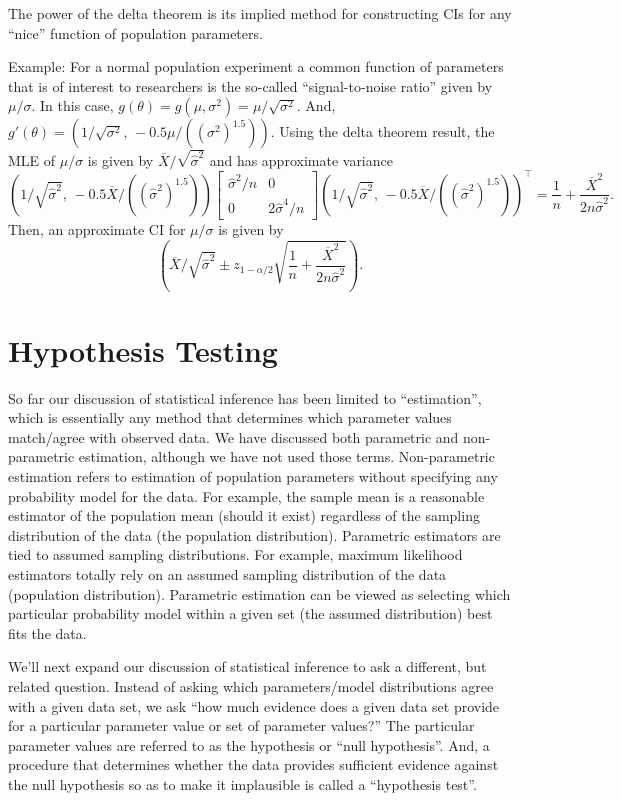 \documentclass[]{book}
\begin{document}
The power of the delta theorem is its implied method for constructing
CIs for any ``nice'' function of population parameters.

Example: For a normal population experiment a common function of
parameters that is of interest to researchers is the so-called
``signal-to-noise ratio'' given by \(\mu/\sigma\). In this case,
\(g(\theta) = g(\mu, \sigma^2) = \mu/\sqrt{\sigma^2}\). And,
\(g'(\theta) = (1/\sqrt{\sigma^2},\, -0.5\mu/({(\sigma^2)}^{1.5}))\).
Using the delta theorem result, the MLE of \(\mu/\sigma\) is given by
\(\overline X / \sqrt{\hat\sigma^2}\) and has approximate variance
\[(1/\sqrt{\hat\sigma^2},\, -0.5\overline X/({(\hat\sigma^2)}^{1.5})) \begin{bmatrix} \hat\sigma^2/n & 0 \\ 0 & 2\hat\sigma^4/n \end{bmatrix} (1/\sqrt{\hat\sigma^2},\, -0.5\overline X/({(\hat\sigma^2)}^{1.5}))^\top = \frac{1}{n}+\frac{\overline X^2}{2n\hat\sigma^2}.\]
Then, an approximate CI for \(\mu/\sigma\) is given by
\[\left(\overline X / \sqrt{\hat\sigma^2} \pm z_{1-\alpha/2}\sqrt{\frac{1}{n}+\frac{\overline X^2}{2n\hat\sigma^2}}\right).\]

\chapter{Hypothesis Testing}\label{hypothesis-testing}

So far our discussion of statistical inference has been limited to
``estimation'', which is essentially any method that determines which
parameter values match/agree with observed data. We have discussed both
parametric and non-parametric estimation, although we have not used
those terms. Non-parametric estimation refers to estimation of
population parameters without specifying any probability model for the
data. For example, the sample mean is a reasonable estimator of the
population mean (should it exist) regardless of the sampling
distribution of the data (the population distribution). Parametric
estimators are tied to assumed sampling distributions. For example,
maximum likelihood estimators totally rely on an assumed sampling
distribution of the data (population distribution). Parametric
estimation can be viewed as selecting which particular probability model
within a given set (the assumed distribution) best fits the data.

We'll next expand our discussion of statistical inference to ask a
different, but related question. Instead of asking which
parameters/model distributions agree with a given data set, we ask ``how
much evidence does a given data set provide for a particular parameter
value or set of parameter values?'' The particular parameter values are
referred to as the hypothesis or ``null hypothesis''. And, a procedure
that determines whether the data provides sufficient evidence against
the null hypothesis so as to make it implausible is called a
``hypothesis test''.
\end{document}
